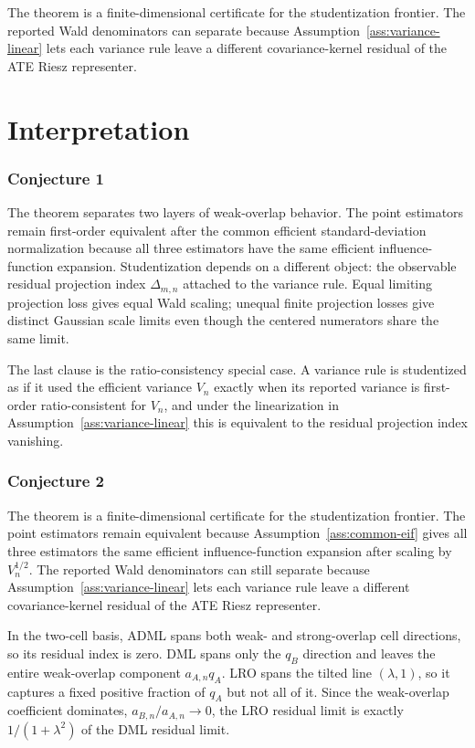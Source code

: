 \documentclass[11pt]{article}
\theoremstyle{definition}
\theoremstyle{plain}
\theoremstyle{remark}
\begin{document}
The theorem is a finite-dimensional certificate for the studentization frontier.  The reported Wald denominators can separate because Assumption~\ref{ass:variance-linear} lets each variance rule leave a different covariance-kernel residual of the ATE Riesz representer.

\section{Interpretation}
\subsubsection*{Conjecture 1}
The theorem separates two layers of weak-overlap behavior.  The point
estimators remain first-order equivalent after the common efficient
standard-deviation normalization because all three estimators have the same
efficient influence-function expansion.  Studentization depends on a different
object: the observable residual projection index \(\Delta_{m,n}\) attached to
the variance rule.  Equal limiting projection loss gives equal Wald scaling;
unequal finite projection losses give distinct Gaussian scale limits even
though the centered numerators share the same limit.

The last clause is the ratio-consistency special case.  A variance rule is
studentized as if it used the efficient variance \(V_n\) exactly when its
reported variance is first-order ratio-consistent for \(V_n\), and under the
linearization in Assumption~\ref{ass:variance-linear} this is equivalent to
the residual projection index vanishing.

\subsubsection*{Conjecture 2}
The theorem is a finite-dimensional certificate for the studentization frontier.  The point estimators remain equivalent because Assumption~\ref{ass:common-eif} gives all three estimators the same efficient influence-function expansion after scaling by \(V_n^{1/2}\).  The reported Wald denominators can still separate because Assumption~\ref{ass:variance-linear} lets each variance rule leave a different covariance-kernel residual of the ATE Riesz representer.

In the two-cell basis, ADML spans both weak- and strong-overlap cell directions, so its residual index is zero.  DML spans only the \(q_B\) direction and leaves the entire weak-overlap component \(a_{A,n}q_A\).  LRO spans the tilted line \((\lambda,1)\), so it captures a fixed positive fraction of \(q_A\) but not all of it.  Since the weak-overlap coefficient dominates, \(a_{B,n}/a_{A,n}\to0\), the LRO residual limit is exactly \(1/(1+\lambda^2)\) of the DML residual limit.
\end{document}
